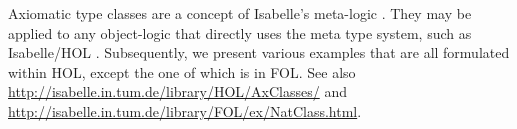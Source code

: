 Axiomatic type classes are a concept of Isabelle's meta-logic
\cite{paulson-isa-book,Wenzel:1997:TPHOL}.  They may be applied to any
object-logic that directly uses the meta type system, such as Isabelle/HOL
\cite{isabelle-HOL}.  Subsequently, we present various examples that are all
formulated within HOL, except the one of  which is in
FOL.  See also \url{http://isabelle.in.tum.de/library/HOL/AxClasses/} and
\url{http://isabelle.in.tum.de/library/FOL/ex/NatClass.html}.



















